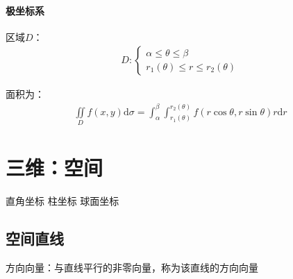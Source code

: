 \documentclass[12pt]{book}
\begin{document}
\paragraph{极坐标系}



区域$D$：
\begin{gather*}
    D: \begin{cases}
        \alpha\leqslant\theta\leqslant\beta \\
        r_{1}(\theta)\leqslant r\leqslant r_{2}(\theta)
    \end{cases}
\end{gather*}

面积为：
\begin{gather*}
    \iint\limits_{D}{f(x,y)\mathrm{d}\sigma } = \int_{\alpha}^{\beta}\int_{r_{1}(\theta)}^{r_{2}(\theta)}{f(r\cos{\theta},r\sin{\theta})r \mathrm{d}r}
\end{gather*}


\section{三维：空间}





直角坐标 
柱坐标
球面坐标















\subsection{空间直线}


方向向量：与直线平行的非零向量，称为该直线的方向向量
\end{document}
